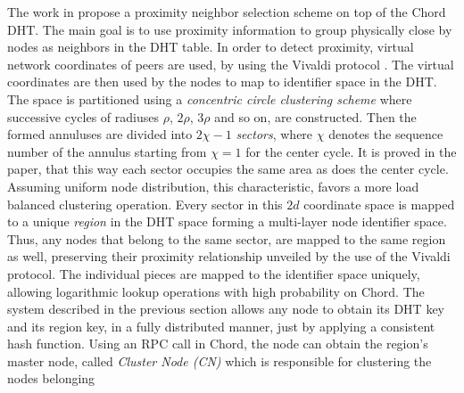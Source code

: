 
The work in \cite{DLTZZ2006} propose a proximity neighbor selection
scheme on top of the Chord DHT. The main goal is to use proximity information
to group physically close by nodes as neighbors in the DHT table. In order to
detect proximity, virtual network coordinates of peers are used, by using the
Vivaldi protocol \cite{cox_vivaldi_2004}. The virtual coordinates are then used
by the nodes to map to identifier space in the DHT. The space is partitioned
using a \emph{concentric circle clustering scheme} where successive cycles of
radiuses $\rho$, $2\rho$, $3\rho$ and so on, are constructed. Then the formed
annuluses are divided into $2\chi-1$ \emph{sectors}, where $\chi$ denotes the
sequence number of the annulus starting from $\chi = 1$ for the center cycle. It
is proved in the paper, that this way each sector occupies the same area as does
the center cycle. Assuming uniform node distribution, this characteristic,
favors a more load balanced clustering operation. Every sector in this $2d$
coordinate space is mapped to a unique \emph{region} in the DHT space forming a
multi-layer node identifier space.  Thus, any nodes that belong to the same
sector, are mapped to the same region as well, preserving their proximity
relationship unveiled by the use of the Vivaldi protocol. The individual pieces
are mapped to the identifier space uniquely, allowing logarithmic lookup
operations with high probability on Chord. The system described in the previous
section allows any node to obtain its DHT key and its region key, in a fully
distributed manner, just by applying a consistent hash function. Using an RPC
call in Chord, the node can obtain the region's master node, called
\emph{Cluster Node (CN)} which is responsible for clustering the nodes belonging
